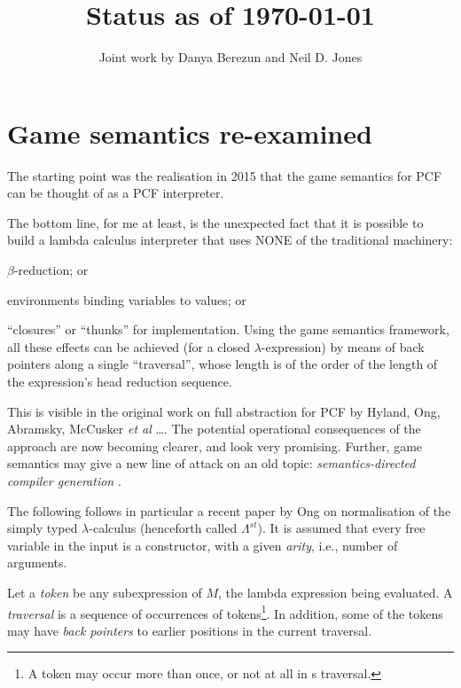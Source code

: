 \documentclass{llncs}
\title{Status as of  
\today}
\author {Joint work by Danya Berezun and Neil D. Jones}
\institute{DIKU}
\begin{document}

\setcounter{tocdepth}{3}

\maketitle

\section{Game semantics re-examined}

The starting point was the realisation  in 2015 that the game semantics for PCF can be thought of as a PCF interpreter. 

The bottom line, for me at least, is the unexpected fact that it is possible to build a lambda calculus interpreter that uses NONE of the traditional machinery: 
\bi
\item $\beta$-reduction; or 
\item environments binding variables to values; or 
\item ``closures'' or  ``thunks''  for implementation.
\ei
Using the game semantics framework, all these effects can be achieved (for a closed $\lambda$-expression)  by means of back pointers along a single ``traversal'', whose length is of the order of the length of the expression's head reduction sequence. 

This is visible in the original work on full abstraction for PCF by Hyland, Ong, Abramsky, McCusker {\em et al}
\cite{DBLP:journals/iandc/HylandO00,abramskyMcCusker97,DBLP:conf/tacs/AbramskyMJ94}\ldots. The potential operational consequences of the approach are  now becoming clearer, and look very promising. Further, game semantics may give a new line of attack on an old topic: {\em semantics-directed compiler generation}
\cite{DBLP:conf/cc/1980,DBLP:conf/cc/Schmidt80}.

The following follows in particular a recent paper \cite{ong} by  Ong on normalisation of the simply typed $\lambda$-calculus (henceforth called $\Lambda^{st}$). It is assumed that every free variable in the input is a constructor, with a given {\em arity}, i.e., number of arguments.

Let a {\em token} be any subexpression of $M$, the lambda expression being evaluated.
A {\em traversal} is a sequence of occurrences of 
tokens\footnote{A token may occur more than once, or not at all in s traversal.}. 
In addition, some of the tokens may have {\em back pointers} to earlier positions in the current traversal. 
\end{document}
